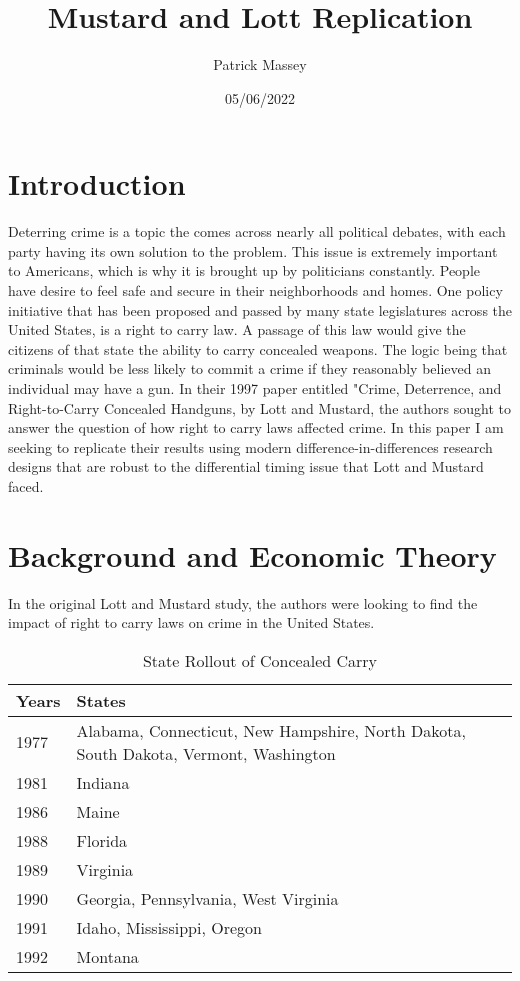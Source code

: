 \documentclass{article}
\author{Patrick Massey}
\title{Mustard and Lott Replication}
\date{05/06/2022}
\begin{document}
\maketitle

\section*{Introduction}
Deterring crime is a topic the comes across nearly all political debates, with each party having its own solution to the problem. This issue is extremely important to Americans, which is why it is brought up by politicians constantly. People have desire to feel safe and secure in their neighborhoods and homes. One policy initiative that has been proposed and passed by many state legislatures across the United States, is a right to carry law. A passage of this law would give the citizens of that state the ability to carry concealed weapons. The logic being that criminals would be less likely to commit a crime if they reasonably believed an individual may have a gun. In their 1997 paper entitled "Crime, Deterrence, and Right-to-Carry Concealed Handguns, by Lott and Mustard, the authors sought to answer the question of how right to carry laws affected crime. In this paper I am seeking to replicate their results using modern difference-in-differences research designs that are robust to the differential timing issue that Lott and Mustard faced. 
\section*{Background and Economic Theory}
In the original Lott and Mustard study, the authors were looking to find the impact of right to carry laws on crime in the United States. 

\begin{table}[h]

\caption{\label{tab:rollout}State Rollout of Concealed Carry}
\centering
\begin{tabular}[t]{ll}
\toprule
Years & States\\
\midrule
1977 & Alabama, Connecticut, New Hampshire, North Dakota, South Dakota, Vermont, Washington\\
1981 & Indiana\\
1986 & Maine\\
1988 & Florida\\
1989 & Virginia\\
1990 & Georgia, Pennsylvania, West Virginia\\
1991 & Idaho, Mississippi, Oregon\\
1992 & Montana\\
\bottomrule
\end{tabular}
\end{table}
\end{document}

